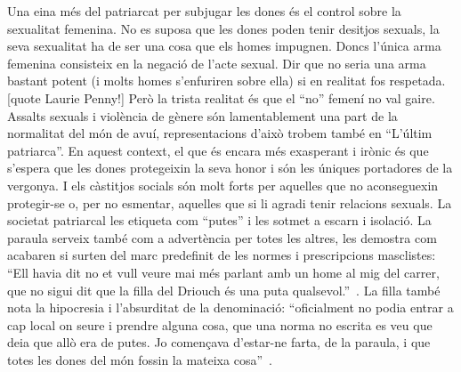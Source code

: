Una eina més del patriarcat per subjugar les dones és el control sobre la sexualitat femenina.
No es suposa que les dones poden tenir desitjos sexuals, la seva sexualitat ha de ser una cosa que els homes impugnen.
Doncs l'única arma femenina consisteix en la negació de l'acte sexual.
Dir que no seria una arma bastant potent (i molts homes s'enfuriren sobre ella) si en realitat fos respetada.[quote Laurie Penny!]
Però la trista realitat és que el ``no'' femení no val gaire.
Assalts sexuals i violència de gènere són lamentablement una part de la normalitat del món de avuí, representacions d'això trobem també en ``L'últim patriarca''.
En aquest context, el que és encara més exasperant i irònic és que s'espera que les dones protegeixin la seva honor i són les úniques portadores de la vergonya.
I els càstitjos socials són molt forts per aquelles que no aconseguexin protegir-se o, per no esmentar, aquelles que si li agradi tenir relacions sexuals.
La societat patriarcal les etiqueta com ``putes'' i les sotmet a escarn i isolació.
La paraula serveix també com a advertència per totes les altres, les demostra com acabaren si surten del marc predefinit de les normes i prescripcions masclistes:
``Ell havia dit no et vull veure mai més parlant amb un home al mig del carrer, que no sigui dit que la filla del Driouch és una puta qualsevol.''~\autocite[269]{ElHachmi2008}.
La filla també nota la hipocresia i l'absurditat de la denominació:
``oficialment no podia entrar a cap local on seure i prendre alguna cosa, que una norma no escrita es veu que deia que allò era de putes. Jo començava d'estar-ne farta, de la paraula, i que totes les dones del món fossin la mateixa cosa''~\autocite[285]{ElHachmi2008}.


